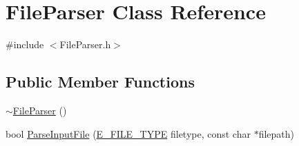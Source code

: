 \section{File\-Parser Class Reference}
\label{class_file_parser}


{\ttfamily \#include $<$File\-Parser.\-h$>$}

\subsection*{Public Member Functions}
\begin{DoxyCompactItemize}
\item 
\hyperlink{class_file_parser_a8b41aca52b30e9f357f50e76f3c9cc9d}{$\sim$\-File\-Parser} ()
\item 
bool \hyperlink{class_file_parser_a5e9afb1f972834a822ee7f24d34281a3}{Parse\-Input\-File} (\hyperlink{_file_parser_8h_a77516d1e52649fa212cc16893769cf63}{E\-\_\-\-F\-I\-L\-E\-\_\-\-T\-Y\-P\-E} filetype, const char $\ast$filepath)
\end{DoxyCompactItemize}
